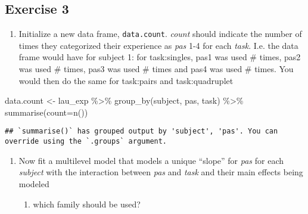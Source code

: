 \documentclass[
]{article}
\newenvironment{Shaded}{\begin{snugshade}}{\end{snugshade}}
\newcommand{\AttributeTok}[1]{\textcolor[rgb]{0.77,0.63,0.00}{#1}}
\newcommand{\FunctionTok}[1]{\textcolor[rgb]{0.00,0.00,0.00}{#1}}
\newcommand{\NormalTok}[1]{#1}
\newcommand{\OtherTok}[1]{\textcolor[rgb]{0.56,0.35,0.01}{#1}}
\newcommand{\SpecialCharTok}[1]{\textcolor[rgb]{0.00,0.00,0.00}{#1}}
\providecommand{\tightlist}{%
  \setlength{\itemsep}{0pt}\setlength{\parskip}{0pt}}
\begin{document}
\hypertarget{exercise-3}{%
\subsection{Exercise 3}\label{exercise-3}}

\begin{enumerate}
\def\labelenumi{\arabic{enumi})}
\tightlist
\item
  Initialize a new data frame, \texttt{data.count}. \emph{count} should
  indicate the number of times they categorized their experience as
  \emph{pas} 1-4 for each \emph{task}. I.e. the data frame would have
  for subject 1: for task:singles, pas1 was used \# times, pas2 was used
  \# times, pas3 was used \# times and pas4 was used \# times. You would
  then do the same for task:pairs and task:quadruplet
\end{enumerate}

\begin{Shaded}
\begin{Highlighting}[]
\NormalTok{data.count }\OtherTok{\textless{}{-}}\NormalTok{ lau\_exp }\SpecialCharTok{\%\textgreater{}\%} 
  \FunctionTok{group\_by}\NormalTok{(subject, pas, task) }\SpecialCharTok{\%\textgreater{}\%} 
  \FunctionTok{summarise}\NormalTok{(}\AttributeTok{count=}\FunctionTok{n}\NormalTok{())}
\end{Highlighting}
\end{Shaded}

\begin{verbatim}
## `summarise()` has grouped output by 'subject', 'pas'. You can override using the `.groups` argument.
\end{verbatim}

\begin{Shaded}
\end{Shaded}

\begin{enumerate}
\def\labelenumi{\arabic{enumi})}
\setcounter{enumi}{1}
\tightlist
\item
  Now fit a multilevel model that models a unique ``slope'' for
  \emph{pas} for each \emph{subject} with the interaction between
  \emph{pas} and \emph{task} and their main effects being modeled

  \begin{enumerate}
  \def\labelenumii{\roman{enumii}.}
  \tightlist
  \item
    which family should be used?
  \end{enumerate}
\end{enumerate}
\end{document}
